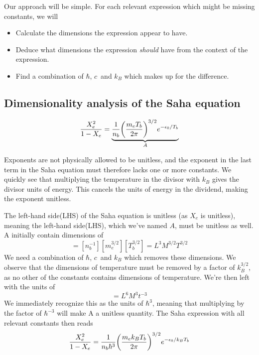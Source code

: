 \documentclass[10pt, a4paper]{article}
\begin{document}
Our approach will be simple. For each relevant expression which might be missing constants, we will
\begin{itemize}
    \item Calculate the dimensions the expression appear to have.
    \item Deduce what dimensions the expression \textit{should} have from the context of the expression.
    \item Find a combination of $\hbar$, $c$ and $k_B$ which makes up for the difference.
\end{itemize}


\subsection{Dimensionality analysis of the Saha equation}
\begin{equation}
    \frac{X_{e}^{2}}{1-X_{e}} = \underbrace{\frac{1}{n_{b}}\qty(\frac{m_{e} T_{b}}{2 \pi})^{3 / 2} e^{-\epsilon_{0} / T_{b}}}_A
\end{equation}

Exponents are not physically allowed to be unitless, and the exponent in the last term in the Saha equation must therefore lacks one or more constants. We quickly see that multiplying the temperature in the divisor with $k_B$ gives the divisor units of energy. This cancels the units of energy in the dividend, making the exponent unitless.

The left-hand side(LHS) of the Saha equation is unitless (as $X_e$ is unitless), meaning the left-hand side(LHS), which we've named $A$, must be unitless as well. A initially contain dimensions of
\begin{equation*}
    [A] = [n_b^{-1}][m_e^{3/2}][T_b^{3/2}] = L^3M^{3/2}T^{3/2}
\end{equation*}
We need a combination of $\hbar$, $c$ and $k_B$ which removes these dimensions. We observe that the dimensions of temperature must be removed by a factor of $k_B^{3/2}$, as no other of the constants contains dimensions of temperature. We're then left with the units of
\begin{equation*}
    [A][k_B^{3/2}] = L^6M^3t^{-3}
\end{equation*}
We immediately recognize this as the units of $\hbar^3$, meaning that multiplying by the factor of $\hbar^{-3}$ will make A a unitless quantity. The Saha expression with all relevant constants then reads
\begin{equation}
    \frac{X_{e}^{2}}{1-X_{e}} = \frac{1}{n_{b}\hbar^3}\qty(\frac{m_{e} k_B T_{b}}{2 \pi})^{3 / 2} e^{-\epsilon_{0} / k_B T_{b}}
\end{equation}
\end{document}
